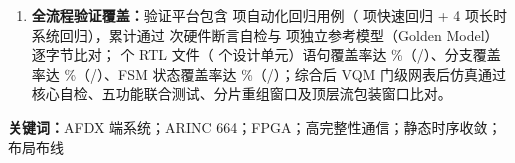 \documentclass[a4paper,zihao=-4,fontset=none,oneside,openany]{ctexrep}
\begin{document}
\begin{enumerate}[leftmargin=2em,itemsep=1pt]
  \item \textbf{全流程验证覆盖：}验证平台包含 \RegCount{} 项自动化回归用例（\RegFastCount{} 项快速回归 + 4 项长时系统回归），累计通过 \RegChecks{} 次硬件断言自检与 \RegIndep{} 项独立参考模型（Golden Model）逐字节比对；\RtlFileCount{} 个 RTL 文件（\DesignUnitCount{} 个设计单元）语句覆盖率达 \CovStmt\%（\CovStmtCov/\CovStmtTot）、分支覆盖率达 \CovBranch\%（\CovBranchCov/\CovBranchTot）、FSM 状态覆盖率达 \CovFsmState\%（\CovFsmStateCov/\CovFsmStateTot）；综合后 VQM 门级网表后仿真通过核心自检、五功能联合测试、分片重组窗口及顶层流包装窗口比对。
\end{enumerate}

\vspace{0.8em}
\noindent\textbf{关键词：}AFDX 端系统；ARINC 664；FPGA；高完整性通信；静态时序收敛；布局布线

\clearpage

\setcounter{tocdepth}{1}
\begingroup
\small\linespread{1.08}\selectfont
\setlength{\parskip}{0pt}
\tableofcontents
\endgroup
\clearpage
{}












\appendix

\end{document}
